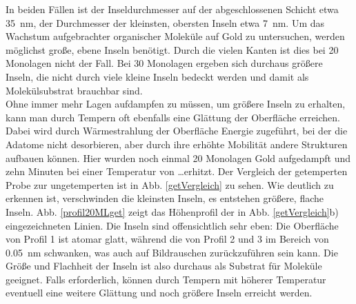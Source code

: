 In beiden Fällen ist der Inseldurchmesser auf der abgeschlossenen Schicht etwa \SI{35}{nm}, der Durchmesser
der kleinsten, obersten Inseln etwa \SI{7}{nm}. Um das Wachstum aufgebrachter organischer Moleküle
auf Gold zu untersuchen, werden möglichst große, ebene Inseln benötigt. Durch die vielen Kanten ist dies bei
20 Monolagen nicht der Fall. Bei 30 Monolagen ergeben sich durchaus größere Inseln, die nicht durch
viele kleine Inseln bedeckt werden und damit als Molekülsubstrat brauchbar sind.\\
Ohne immer mehr Lagen aufdampfen zu müssen, um größere Inseln zu erhalten, kann man durch Tempern
oft ebenfalls eine Glättung der Oberfläche erreichen. Dabei wird durch Wärmestrahlung der Oberfläche
Energie zugeführt, bei der die Adatome nicht desorbieren, aber durch ihre erhöhte Mobilität
andere Strukturen aufbauen können. Hier wurden noch einmal 20 Monolagen Gold aufgedampft und zehn
Minuten bei einer Temperatur von \ldots erhitzt. Der Vergleich der getemperten Probe zur
ungetemperten ist in Abb. \ref{getVergleich} zu sehen.
Wie deutlich zu erkennen ist, verschwinden die kleinsten Inseln, es entstehen größere, flache
Inseln. Abb. \ref{profil20MLget} zeigt das Höhenprofil der in Abb. \ref{getVergleich}b)
eingezeichneten Linien. Die Inseln sind offensichtlich sehr eben: Die Oberfläche von Profil 1 ist
atomar glatt, während die von Profil 2 und 3 im Bereich von \SI{0,05}{nm} schwanken, was auch auf
Bildrauschen zurückzuführen sein kann. Die Größe und Flachheit der Inseln ist also durchaus als
Substrat für Moleküle geeignet. Falls erforderlich, können durch Tempern mit höherer Temperatur
eventuell eine weitere Glättung und noch größere Inseln erreicht werden. 

